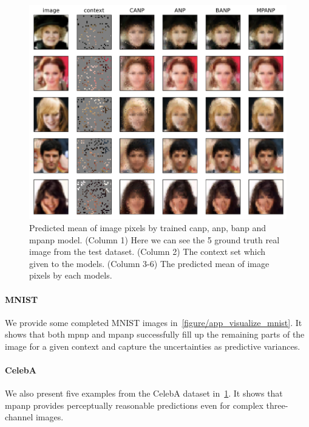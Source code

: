 \begin{figure}
    \centering
    \includegraphics[width=\linewidth]{figure/app_visualize_celeba.pdf}
    \caption{Predicted mean of image pixels by trained \gls{canp}, \gls{anp}, \gls{banp} and \gls{mpanp} model. (Column 1) Here we can see the 5 ground truth real image from the test dataset. (Column 2) The context set which given to the models. (Column 3-6) The predicted mean of image pixels by each models.}
    \label{figure/app_visualize_celeba}
\end{figure}


\paragraph{MNIST}
We provide some completed MNIST images in~\cref{figure/app_visualize_mnist}. It shows that both \gls{mpnp} and \gls{mpanp} successfully fill up the remaining parts of the image for a given context and capture the uncertainties as predictive variances.

\paragraph{CelebA}
We also present five examples from the CelebA dataset in~\cref{figure/app_visualize_celeba}. It shows that \gls{mpanp} provides perceptually reasonable predictions even for complex three-channel images.


